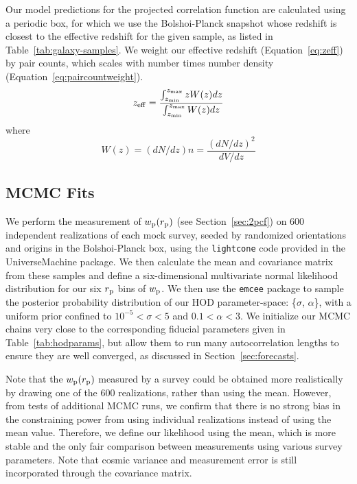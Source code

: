 \documentclass[twocolumn,twocolappendix]{aastex63}
\begin{document}
Our model predictions for the projected correlation function are calculated using a periodic box, for which we use the Bolshoi-Planck snapshot whose redshift is closest to the effective redshift for the given sample, as listed in Table~\ref{tab:galaxy-samples}. We weight our effective redshift (Equation~\ref{eq:zeff}) by pair counts, which scales with number times number density (Equation~\ref{eq:paircountweight}).
\begin{equation} \label{eq:zeff}
    z_{\rm eff} = \frac{\int_{z_{\rm min}}^{z_{\rm max}} z W(z) dz}{\int_{z_{\rm min}}^{z_{\rm max}} W(z) dz}
\end{equation}
where
\begin{equation} \label{eq:paircountweight}
    W(z) = (dN / dz) n = \frac{(dN/dz)^2}{dV/dz}
\end{equation}


\subsection{MCMC Fits}
\label{sec:mcmc}

We perform the measurement of $w_{\rm p}(r_{\rm p})$ (see Section~\ref{sec:2pcf}) on 600 independent realizations of each mock survey, seeded by randomized orientations and origins in the Bolshoi-Planck box, using the \verb|lightcone| code provided in the UniverseMachine package. We then calculate the mean and covariance matrix from these samples and define a six-dimensional multivariate normal likelihood distribution for our six $r_{\rm p}$ bins of $w_{\rm p}$. We then use the \verb|emcee| package to sample the posterior probability distribution of our HOD parameter-space: \{$\sigma$, $\alpha$\}, with a uniform prior confined to $10^{-5} < \sigma < 5$ and $0.1 < \alpha < 3$. We initialize our MCMC chains very close to the corresponding fiducial parameters given in Table~\ref{tab:hodparams}, but allow them to run many autocorrelation lengths to ensure they are well converged, as discussed in Section~\ref{sec:forecasts}.

Note that the $w_{\rm p}(r_{\rm p})$ measured by a survey could be obtained more realistically by drawing one of the 600 realizations, rather than using the mean. However, from tests of additional MCMC runs, we confirm that there is no strong bias in the constraining power from using individual realizations instead of using the mean value. Therefore, we define our likelihood using the mean, which is more stable and the only fair comparison between measurements using various survey parameters. Note that cosmic variance and measurement error is still incorporated through the covariance matrix.
\end{document}
